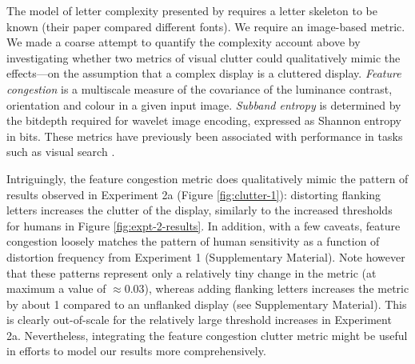 \documentclass[doc, 11pt,a4paper,natbib]{apa6}\usepackage[]{graphicx}\usepackage[]{color}
\begin{document}
The model of letter complexity presented by \citet{bernard_dependence_2011} requires a letter skeleton to be known (their paper compared different fonts).
We require an image-based metric.
We made a coarse attempt to quantify the complexity account above by investigating whether two metrics of visual clutter \citep{rosenholtz_measuring_2007} could qualitatively mimic the effects---on the assumption that a complex display is a cluttered display.
\textit{Feature congestion} is a multiscale measure of the covariance of the luminance contrast, orientation and colour in a given input image.
\textit{Subband entropy} is determined by the bitdepth required for wavelet image encoding, expressed as Shannon entropy in bits.
These metrics have previously been associated with performance in tasks such as visual search \citep{asher_regional_2013, henderson_influence_2009, rosenholtz_measuring_2007}.

Intriguingly, the feature congestion metric does qualitatively mimic the pattern of results observed in Experiment 2a (Figure \ref{fig:clutter-1}): distorting flanking letters increases the clutter of the display, similarly to the increased thresholds for humans in Figure \ref{fig:expt-2-results}.
In addition, with a few caveats, feature congestion loosely matches the pattern of human sensitivity as a function of distortion frequency from Experiment 1 (Supplementary Material).
Note however that these patterns represent only a relatively tiny change in the metric (at maximum a value of $\approx 0.03$), whereas adding flanking letters increases the metric by about 1 compared to an unflanked display (see Supplementary Material).
This is clearly out-of-scale for the relatively large threshold increases in Experiment 2a.
Nevertheless, integrating the feature congestion clutter metric might be useful in efforts to model our results more comprehensively.
\end{document}
